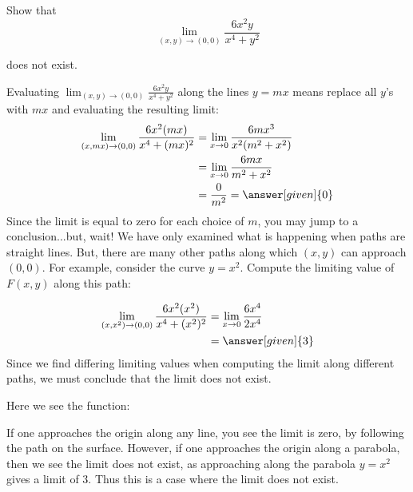 \documentclass{ximera}
\begin{document}
\begin{example}
  Show that
  \[
  \lim_{(x,y)\to(0,0)}  \frac{6x^2y}{x^4+y^2}
  \]
 
  does not exist.
  \begin{explanation}
    Evaluating $\lim_{(x,y)\to(0,0)} \frac{6x^2y}{x^4+y^2}$ along
    the lines $y=mx$ means replace all $y$'s with $mx$ and evaluating
    the resulting limit:
    \begin{align*}
      \lim_{(x,mx)\to(0,0)}  \frac{6x^2(mx)}{x^4+(mx)^2} &=\lim_{x\to0} \frac{6mx^3}{x^2(m^2+x^2)}\\
      &= \lim_{x\to 0}\frac{6mx}{m^2+x^2}\\
      &= {\frac{0}{m^2}}=\answer[given]{0}
    \end{align*}
   Since the limit is equal to zero for each choice of $m$, you may jump to a conclusion...but, wait!
    We have only examined what is happening when paths are straight lines. But, there are many other paths along which $(x,y)$ can approach $(0,0)$. 
    For example, consider the curve $y=x^2$. Compute the limiting value of $F(x,y)$ along this path:

    \begin{align*}
      \lim_{(x,x^2)\to(0,0)}  \frac{6x^2(x^2)}{x^4+(x^2)^2} &=\lim_{x\to0} \frac{6x^4}{2x^4}\\
      &=\answer[given]{ 3}
    \end{align*}
     Since we find differing limiting values when computing the limit
    along different paths, we must conclude that the limit does not
    exist.

\begin{onlineOnly}
  Here we see the function:
 
  \begin{center}
  \end{center}
  If one approaches the origin along any line, you see the limit 
   is zero, by following the path on the
  surface. However, if one approaches the origin along a parabola,
  then we see the limit does not exist, as approaching along the
  parabola $y=x^2$ gives a limit of $3$.
 Thus this is a case where
  the limit does not exist.
\end{onlineOnly}
 \end{explanation}
\end{example}
\end{document}
